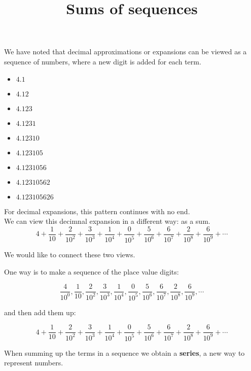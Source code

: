 \documentclass{ximera}
\title{Sums of sequences}
\begin{document}
\begin{abstract}
\end{abstract}

\maketitle




We have noted that decimal approximations or expansions can be viewed as a sequence of numbers, where a new digit is added for each term.


\begin{itemize}
\item $4.1$
\item $4.12$
\item $4.123$
\item $4.1231$
\item $4.12310$
\item $4.123105$
\item $4.1231056$
\item $4.12310562$
\item $4.123105626$
\end{itemize}


For decimal expansions, this pattern continues with no end. \\

We can view this decimnal expansion in a different way: as a sum. \\


\[
4 + \frac{1}{10} + \frac{2}{10^2} + \frac{3}{10^3} + \frac{1}{10^4} + \frac{0}{10^5} + \frac{5}{10^6} + \frac{6}{10^7} + \frac{2}{10^8} + \frac{6}{10^9} + \cdots
\]



We would like to connect these two views.


One way is to make a sequence of the place value digits:  

\[
\frac{4}{10^0}, \frac{1}{10},  \frac{2}{10^2}, \frac{3}{10^3}, \frac{1}{10^4}, \frac{0}{10^5}, \frac{5}{10^6}, \frac{6}{10^7}, \frac{2}{10^8}, \frac{6}{10^9}, \cdots
\]


and then add them up:



\[
4 + \frac{1}{10} + \frac{2}{10^2} + \frac{3}{10^3} + \frac{1}{10^4} + \frac{0}{10^5} + \frac{5}{10^6} + \frac{6}{10^7} + \frac{2}{10^8} + \frac{6}{10^9} + \cdots
\]

When summing up the terms in a sequence we obtain a \textbf{series}, a new way to represent numbers. \\
\end{document}
